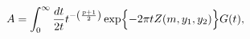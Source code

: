 \begin{equation}
  A =%
 \int_0^\infty \frac{dt}{2t} t^{-\left(\frac{p+1}{2}\right)}\exp\Bigl\{-2\pi t
Z(m,y_1,y_2)\Bigl\} G(t),
\end{equation} 
